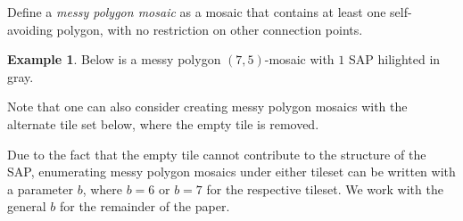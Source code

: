 \documentclass[12pt]{article}
\theoremstyle{plain}
\theoremstyle{definition}
\theoremstyle{remark}
\theoremstyle{definition}
\newtheorem{exmp}{Example}[section]
\newcommand{\cell}[4]{ \draw[thick] ( #1 , #2 ) rectangle ( #3 , #4 );}
\newcommand{\cellA}[4]{ \draw[thick] ( #1 , #2 ) rectangle ( #3 , #4 ); \draw[red, thick] (#3 * 0.5 + #1 * 0.5 , #2) -- (#3, #4 * 0.5 + #2 * 0.5);}
\newcommand{\cellB}[4]{ \draw[thick] ( #1 , #2 ) rectangle ( #3 , #4 ); \draw[red, thick] (#3 * 0.5 + #1 * 0.5 , #2) -- (#1, #4 * 0.5 + #2 * 0.5);}
\newcommand{\cellC}[4]{ \draw[thick] ( #1 , #2 ) rectangle ( #3 , #4 ); \draw[red, thick] (#3 * 0.5 + #1 * 0.5 , #4) -- (#1, #4 * 0.5 + #2 * 0.5);}
\newcommand{\cellD}[4]{ \draw[thick] ( #1 , #2 ) rectangle ( #3 , #4 ); \draw[red, thick] (#3 * 0.5 + #1 * 0.5 , #4) -- (#3, #4 * 0.5 + #2 * 0.5);}
\newcommand{\cellE}[4]{ \draw[thick] ( #1 , #2 ) rectangle ( #3 , #4 ); \draw[red, thick] (#3 * 0.5 + #1 * 0.5 , #2) -- (#3 * 0.5 + #1 * 0.5 , #4);}
\newcommand{\cellF}[4]{ \draw[thick] ( #1 , #2 ) rectangle ( #3 , #4 ); \draw[red, thick] (#3, #4 * 0.5 + #2 * 0.5) -- (#1, #4 * 0.5 + #2 * 0.5);}
\newcommand{\cellAf}[4]{\filldraw[gray!40] ( #1 , #2 ) rectangle ( #3 , #4 ); \draw[thick] ( #1 , #2 ) rectangle ( #3 , #4 ); \draw[red, thick] (#3 * 0.5 + #1 * 0.5 , #2) -- (#3, #4 * 0.5 + #2 * 0.5);}
\newcommand{\cellBf}[4]{\filldraw[gray!40] ( #1 , #2 ) rectangle ( #3 , #4 ); \draw[thick] ( #1 , #2 ) rectangle ( #3 , #4 ); \draw[red, thick] (#3 * 0.5 + #1 * 0.5 , #2) -- (#1, #4 * 0.5 + #2 * 0.5);}
\newcommand{\cellCf}[4]{\filldraw[gray!40] ( #1 , #2 ) rectangle ( #3 , #4 ); \draw[thick] ( #1 , #2 ) rectangle ( #3 , #4 ); \draw[red, thick] (#3 * 0.5 + #1 * 0.5 , #4) -- (#1, #4 * 0.5 + #2 * 0.5);}
\newcommand{\cellDf}[4]{\filldraw[gray!40] ( #1 , #2 ) rectangle ( #3 , #4 ); \draw[thick] ( #1 , #2 ) rectangle ( #3 , #4 ); \draw[red, thick] (#3 * 0.5 + #1 * 0.5 , #4) -- (#3, #4 * 0.5 + #2 * 0.5);}
\newcommand{\cellEf}[4]{\filldraw[gray!40] ( #1 , #2 ) rectangle ( #3 , #4 ); \draw[thick] ( #1 , #2 ) rectangle ( #3 , #4 ); \draw[red, thick] (#3 * 0.5 + #1 * 0.5 , #2) -- (#3 * 0.5 + #1 * 0.5 , #4);}
\newcommand{\cellFf}[4]{\filldraw[gray!40] ( #1 , #2 ) rectangle ( #3 , #4 ); \draw[thick] ( #1 , #2 ) rectangle ( #3 , #4 ); \draw[red, thick] (#3, #4 * 0.5 + #2 * 0.5) -- (#1, #4 * 0.5 + #2 * 0.5);}
\begin{document}
Define a \textit{messy polygon mosaic} as a mosaic that contains at least one self-avoiding polygon, with no restriction on other connection points. 

\begin{exmp}
\label{exmp: messy sap}
Below is a messy polygon $(7,5)$-mosaic with $1$ SAP hilighted in gray. 

\begin{center}
\end{center}
\end{exmp}

Note that one can also consider creating messy polygon mosaics with the alternate tile set below, where the empty tile is removed.

\begin{center}
\end{center}

Due to the fact that the empty tile cannot contribute to the structure of the SAP, enumerating messy polygon mosaics under either tileset can be written with a parameter $b$, where $b=6$ or $b=7$ for the respective tileset. We work with the general $b$ for the remainder of the paper.
\end{document}
